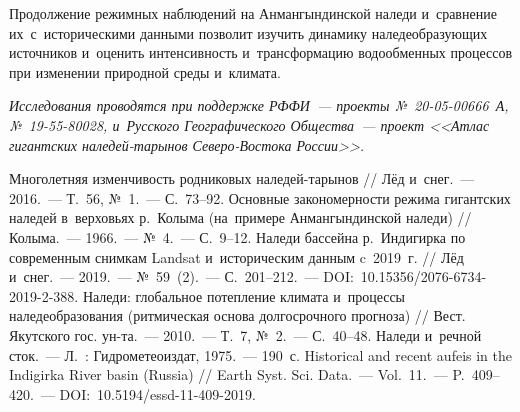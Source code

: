 Продолжение режимных наблюдений на Анмангындинской наледи и~сравнение их~с~историческими данными позволит изучить динамику наледеобразующих источников и~оценить интенсивность и~трансформацию водообменных процессов при изменении природной среды и~климата.

\textit{Исследования проводятся при поддержке РФФИ~--- проекты №~20-05-00666~А, №~19-55-80028, и~Русского Географического Общества~--- проект <<Атлас гигантских наледей-тарынов Северо-Востока России>>.}

\begin{thebibliography}{99}
\bibitem{} Многолетняя изменчивость родниковых наледей-тарынов // Лёд и~снег.~--- 2016.~--- Т.~56, №~1.~--- С.~73--92.
\bibitem{} Основные закономерности режима гигантских наледей в~верховьях р.~Колыма (на~примере Анмангындинской наледи) // Колыма.~--- 1966.~--- №~4.~--- С.~9--12.
\bibitem{} Наледи бассейна р.~Индигирка по современным снимкам Landsat и~историческим данным c~2019~г. // Лёд и~снег.~--- 2019.~--- №~59~(2).~--- С.~201--212.~--- DOI:~10.15356/2076-6734-2019-2-388.
\bibitem{} Наледи: глобальное потепление климата и~процессы наледеобразования (ритмическая основа долгосрочного прогноза) // Вест. Якутского гос. ун-та.~--- 2010.~--- Т.~7, №~2.~--- С.~40--48.
\bibitem{} Наледи и~речной сток.~--- Л.~: Гидрометеоиздат, 1975.~--- 190~с.
\bibitem{} Historical and recent aufeis in the Indigirka River basin (Russia) // Earth Syst. Sci. Data.~--- Vol.~11.~--- P.~409--420.~--- DOI:~10.5194/essd-11-409-2019.
\end{thebibliography}

